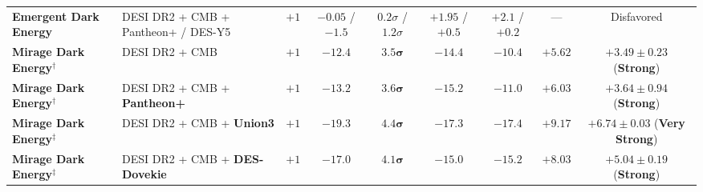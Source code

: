 \documentclass[aps,prd,preprint,superscriptaddress,nofootinbib]{revtex4-2}
\begin{document}
\begin{table}[!htbp]
{\begin{tabular}{llccccccc}
\textbf{Emergent Dark Energy} & DESI DR2 + CMB + Pantheon+ / DES-Y5 & $+1$ & $-0.05$ / $-1.5$ & $0.2\sigma$ / $1.2\sigma$ & $+1.95$ / $+0.5$ & $+2.1$ / $+0.2$ & --- & Disfavored \\
\textbf{Mirage Dark Energy}$^{\dagger}$ & DESI DR2 + CMB & $+1$ & $-12.4$ & $\mathbf{3.5}\boldsymbol{\sigma}$ & $-14.4$ & $-10.4$ & $+5.62$ & $\mathbf{+3.49 \pm 0.23}$ (\textbf{Strong}) \\
\textbf{Mirage Dark Energy}$^{\dagger}$ & DESI DR2 + CMB + \textbf{Pantheon+} & $+1$ & $-13.2$ & $\mathbf{3.6}\boldsymbol{\sigma}$ & $-15.2$ & $-11.0$ & $+6.03$ & $\mathbf{+3.64 \pm 0.94}$ (\textbf{Strong}) \\
\textbf{Mirage Dark Energy}$^{\ddagger}$ & DESI DR2 + CMB + \textbf{Union3} & $+1$ & $-19.3$ & $\mathbf{4.4}\boldsymbol{\sigma}$ & $-17.3$ & $-17.4$ & $+9.17$ & $\mathbf{+6.74 \pm 0.03}$ (\textbf{Very Strong}) \\
\textbf{Mirage Dark Energy}$^{\ddagger}$ & DESI DR2 + CMB + \textbf{DES-Dovekie} & $+1$ & $-17.0$ & $\mathbf{4.1}\boldsymbol{\sigma}$ & $-15.0$ & $-15.2$ & $+8.03$ & $\mathbf{+5.04 \pm 0.19}$ (\textbf{Strong}) \\
\bottomrule
\end{tabular}%
}


\end{table}
\end{document}
